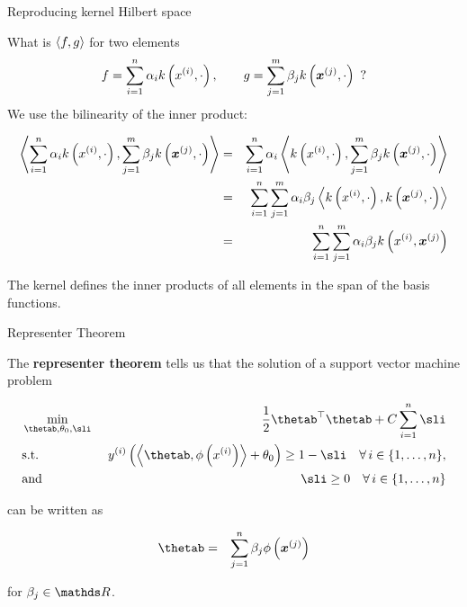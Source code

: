 \begin{vbframe}{Reproducing kernel Hilbert space}
\framebreak

  What is $\left\langle f, g \right\rangle$ for two elements
  $$
    f = \sum_{i=1}^n \alpha_i k\left(x^{(i)}, \cdot\right), \qquad g = \sum_{j=1}^m \beta_j k\left(\bm{x}^{(j)}, \cdot\right)
    \enspace?
  $$
  We use the bilinearity of the inner product:
  \begin{small}
  \begin{eqnarray*}
    \left\langle \sum_{i=1}^n \alpha_i k\left(x^{(i)}, \cdot\right),  \sum_{j=1}^m \beta_j k\left(\bm{x}^{(j)}, \cdot\right) \right\rangle
    &=& \sum_{i=1}^n \alpha_i \left\langle k\left(x^{(i)}, \cdot\right), \sum_{j=1}^m \beta_j k\left(\bm{x}^{(j)}, \cdot\right) \right\rangle \\
    &=& \sum_{i=1}^n \sum_{j=1}^m \alpha_i \beta_j \left\langle k\left(x^{(i)}, \cdot\right), k\left(\bm{x}^{(j)}, \cdot\right) \right\rangle \\
    &=& \sum_{i=1}^n \sum_{j=1}^m \alpha_i \beta_j k\left(x^{(i)}, \bm{x}^{(j)}\right)
  \end{eqnarray*}
  \end{small}
  The kernel defines the inner products of all elements
  in the span of the basis functions.

\end{vbframe}

\begin{vbframe}{Representer Theorem}

The \textbf{representer theorem} tells us that the solution of a support vector machine problem 

\vspace*{-0.5cm}

\begin{eqnarray*}
  & \min\limits_{\thetab, \theta_0,\sli} & \frac{1}{2} \thetab^\top \thetab + C   \sum_{i=1}^n \sli \\
  & \text{s.t.} & \,\, \yi  \left( \scp{\thetab}{\phi\left(\xi\right)} + \theta_0 \right) \geq 1 - \sli \quad \forall\, i \in \nset,\\
  & \text{and} & \,\, \sli \geq 0 \quad \forall\, i \in \nset\\
\end{eqnarray*}

\vspace*{-0.5cm}

can be written as 

\begin{eqnarray*}
  \thetab &=& \sum_{j = 1}^n \beta_j \phi\left(\xv^{(j)}\right)
  \end{eqnarray*}

for $\beta_j \in \R$. 

\end{vbframe}

